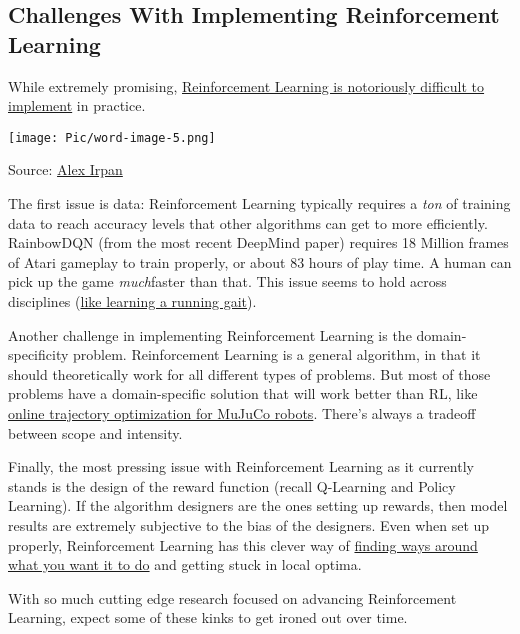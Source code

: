 \documentclass[a4paper, 11pt]{article}
\begin{document}
\subsection{\textbf{Challenges With Implementing Reinforcement
Learning}}

While extremely promising,
\href{https://www.alexirpan.com/2018/02/14/rl-hard.html}{Reinforcement
Learning is notoriously difficult to implement} in practice.

\texttt{[image: Pic/word-image-5.png]}

Source: \href{https://www.alexirpan.com/2018/02/14/rl-hard.html}{Alex
Irpan}

The first issue is data: Reinforcement Learning typically requires a
\emph{ton} of training data to reach accuracy levels that other
algorithms can get to more efficiently. RainbowDQN (from the most recent
DeepMind paper) requires 18 Million frames of Atari gameplay to train
properly, or about 83 hours of play time. A human can pick up the game
\emph{much}faster than that. This issue seems to hold across disciplines
(\href{https://youtu.be/hx_bgoTF7bs}{like learning a running gait}).

Another challenge in implementing Reinforcement Learning is the
domain-specificity problem. Reinforcement Learning is a general
algorithm, in that it should theoretically work for all different types
of problems. But most of those problems have a domain-specific solution
that will work better than RL, like
\href{https://homes.cs.washington.edu/~todorov/papers/TassaIROS12.pdf}{online
trajectory optimization for MuJuCo robots}. There's always a tradeoff
between scope and intensity.

Finally, the most pressing issue with Reinforcement Learning as it
currently stands is the design of the reward function (recall Q-Learning
and Policy Learning). If the algorithm designers are the ones setting up
rewards, then model results are extremely subjective to the bias of the
designers. Even when set up properly, Reinforcement Learning has this
clever way of
\href{https://www.alexirpan.com/public/rl-hard/upsidedown_half_cheetah.mp4}{finding
ways around what you want it to do} and getting stuck in local optima.

With so much cutting edge research focused on advancing Reinforcement
Learning, expect some of these kinks to get ironed out over time.

\subsection{\textbf{\color{orange}{Resources}}}
\end{document}
